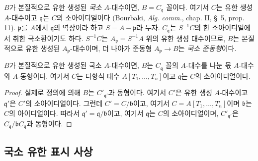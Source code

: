 
\begin{env}[1.3.10]
\label{IV.1.3.10-fr}
$B$가 본질적으로 유한 생성된 \emph{국소} $A$-대수이면,
$B=C_{\mathfrak q}$ 꼴이다. 여기서 $C$는 유한 생성 $A$-대수이고
$\mathfrak q$는 $C$의 소아이디얼이다 (Bourbaki,
\emph{Alg. comm.}, chap. II, \S~5, prop. 11). $\mathfrak p$를
$A$에서 $\mathfrak q$의 역상이라 하고 $S=A-\mathfrak p$라 두자.
$C_{\mathfrak q}$는 $S^{-1}C$의 한 소아이디얼에서 취한 국소환이기도
하다. $S^{-1}C$는 $A_{\mathfrak p}=S^{-1}A$ 위의 유한 생성
대수이므로, $B$는 본질적으로 유한 생성된 $A_{\mathfrak p}$-대수이며,
더 나아가 준동형 $A_{\mathfrak p}\to B$는 \emph{국소 준동형}이다.
\end{env}

\begin{proposition}[1.3.11]
\label{IV.1.3.11-fr}
$B$가 본질적으로 유한 생성된 국소 $A$-대수이면, $B$는
$C_{\mathfrak q}$ 꼴의 $A$-대수를 나눈 몫 $A$-대수와 $A$-동형이다.
여기서 $C$는 다항식 대수 $A[T_1,\ldots,T_n]$이고
$\mathfrak q$는 $C$의 소아이디얼이다.
\end{proposition}

\begin{proof}
실제로 정의에 의해 $B$는 $C'_{\mathfrak q'}$과 동형이다. 여기서
$C'$은 유한 생성 $A$-대수이고 $\mathfrak q'$은 $C'$의 소아이디얼이다.
그런데 $C'=C/\mathfrak b$이고, 여기서
$C=A[T_1,\ldots,T_n]$이며 $\mathfrak b$는 $C$의 아이디얼이다.
따라서 $\mathfrak q'=\mathfrak q/\mathfrak b$이고, 여기서
$\mathfrak q$는 $C$의 소아이디얼이며, $C'_{\mathfrak q'}$은
$C_{\mathfrak q}/\mathfrak bC_{\mathfrak q}$과 동형이다.
\end{proof}

\subsection{국소 유한 표시 사상}
\label{subsection:IV.1.4-fr}

